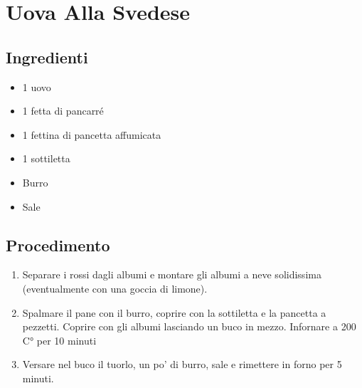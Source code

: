 \section{Uova Alla Svedese}
\subsection{Ingredienti}
\begin{itemize}
\item 1 uovo  
\item 1 fetta di pancarré  
\item 1 fettina di pancetta affumicata  
\item 1 sottiletta  
\item Burro  
\item Sale
\end{itemize}
\subsection{Procedimento}
\begin{enumerate}
\item  Separare i rossi dagli albumi e montare gli albumi a neve solidissima (eventualmente con una goccia di limone).   
\item  Spalmare il pane con il burro, coprire con la sottiletta e la pancetta a pezzetti. Coprire con gli albumi lasciando un buco in mezzo. Infornare a 200 C° per 10 minuti  
\item  Versare nel buco il tuorlo, un po' di burro, sale e rimettere in forno per 5 minuti.
\end{enumerate}
